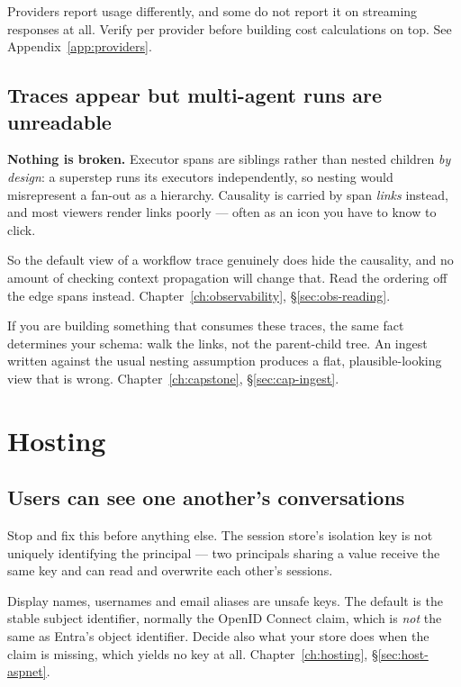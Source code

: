 Providers report usage differently, and some do not report it on streaming
responses at all. Verify per provider before building cost calculations on top.
See Appendix~\ref{app:providers}.

\subsection{Traces appear but multi-agent runs are unreadable}

\textbf{Nothing is broken.} Executor spans are siblings rather than nested
children \emph{by design}: a superstep runs its executors independently, so
nesting would misrepresent a fan-out as a hierarchy. Causality is carried by span
\emph{links} instead, and most viewers render links poorly --- often as an icon
you have to know to click.

So the default view of a workflow trace genuinely does hide the causality, and no
amount of checking context propagation will change that. Read the ordering off
the edge spans instead. Chapter~\ref{ch:observability}, \S\ref{sec:obs-reading}.

If you are building something that consumes these traces, the same fact
determines your schema: walk the links, not the parent-child tree. An ingest
written against the usual nesting assumption produces a flat, plausible-looking
view that is wrong. Chapter~\ref{ch:capstone}, \S\ref{sec:cap-ingest}.

\section{Hosting}

\subsection{Users can see one another's conversations}

Stop and fix this before anything else. The session store's isolation key is not
uniquely identifying the principal --- two principals sharing a value receive the
same key and can read and overwrite each other's sessions.

Display names, usernames and email aliases are unsafe keys. The default is the
stable subject identifier, normally the OpenID Connect  claim, which is
\emph{not} the same as Entra's object identifier. Decide also what your store
does when the claim is missing, which yields no key at all.
Chapter~\ref{ch:hosting}, \S\ref{sec:host-aspnet}.

